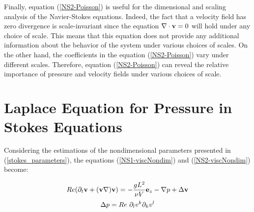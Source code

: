 Finally, equation (\ref{NS2-Poisson}) is useful for the dimensional and scaling analysis of the Navier-Stokes equations. Indeed, the fact that a velocity field has zero divergence is scale-invariant since the equation $\nabla\cdot \mathbf{v} = 0$ will hold under any choice of scale. This means that this equation does not provide any additional information about the behavior of the system under various choices of scales. On the other hand, the coefficients in the equation (\ref{NS2-Poisson}) vary under different scales. Therefore, equation (\ref{NS2-Poisson}) can reveal the relative importance of pressure and velocity fields under various choices of scale. 

\section{Laplace Equation for Pressure in Stokes Equations} \label{pressure_laplace}

Considering the estimations of the nondimensional parameters presented in (\ref{stokes_parameters}), the equations (\ref{NS1-viscNondim}) and (\ref{NS2-viscNondim}) become:

\begin{equation} 
Re(\partial_t\mathbf{v} + (\mathbf{v}\nabla)\mathbf{v}) = -\frac{gL^2}{\nu V} \mathbf{e}_z - \nabla p + \Delta\mathbf{v} 
\end{equation}
\begin{equation} 
\Delta p = Re ~\partial_lv^k\partial_kv^l
\end{equation}

